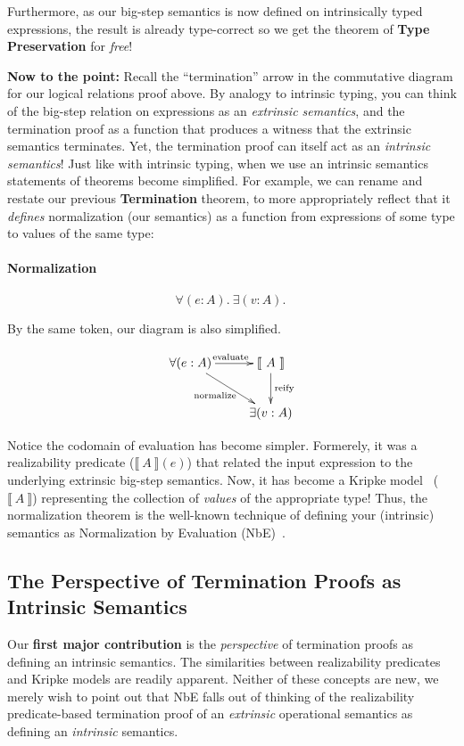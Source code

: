 \documentclass[preprint,nonatbib]{sigplanconf}
\numberwithin{mysubdfn}{mydfn}
\newcommand{\ascribe}[2]{(#1 : #2)}
\newcommand{\all}[1]{\forall#1.~}
\newcommand{\ex}[1]{\exists#1.~}
\newcommand{\el}[1]{\llbracket ~ #1 ~ \rrbracket}
\newcommand{\fun}[1]{\textmd{#1}}
\begin{document}
Furthermore, as our big-step semantics is now defined on intrinsically
typed expressions, the result is already type-correct so we get the
theorem of {\bf Type Preservation} for {\it free}!

{\bf Now to the point:} 
Recall the ``termination'' arrow in the commutative diagram for our
logical relations proof above. By analogy to intrinsic typing, you
can think of the big-step relation on expressions as an
{\it extrinsic semantics}, and the termination proof as a function
that produces a witness that the extrinsic semantics terminates. Yet,
the termination proof can itself act as an {\it intrinsic semantics}! 
Just like with intrinsic typing, when we use an intrinsic semantics
statements of theorems become simplified. For example, we can rename
and restate our previous {\bf Termination} theorem, to more
appropriately reflect that it {\it defines} normalization (our
semantics) as a function from expressions of some type to values of
the same type:

\paragraph{Normalization}
$$
\all{\ascribe{e}{A}} \ex{\ascribe{v}{A}}
$$

By the same token, our diagram is also simplified.

\begin{displaymath}
    \xymatrix{
          {\forall (e : A)} 
          \ar[dr]_{\fun{normalize}}
          \ar[r]^{\fun{evaluate}}
        & {\el{A}}
          \ar[d]^{\large{\fun{reify}}}
\\      & \exists (v : A) }
\end{displaymath}

Notice the codomain of evaluation has become simpler. Formerely, it
was a realizability predicate ($\el{A}(e)$) that related the input
expression to the underlying extrinsic big-step semantics. Now, it has
become a Kripke model~\cite{TODO} ($\el{A}$) representing the
collection of {\it values} of the appropriate type! Thus, the normalization
theorem is the well-known technique of defining your (intrinsic)
semantics as Normalization by Evaluation (NbE)~\cite{TODO}.

\subsection{The Perspective of Termination Proofs as Intrinsic Semantics}

Our {\bf first major contribution} is the {\it perspective} of
termination proofs as defining an intrinsic semantics.
The similarities between realizability predicates and Kripke models are
readily apparent. Neither of these concepts are new, we merely wish
to point out that NbE falls out of thinking of the
realizability predicate-based termination proof of an {\it extrinsic}
operational semantics as defining an {\it intrinsic}
semantics.
\end{document}
